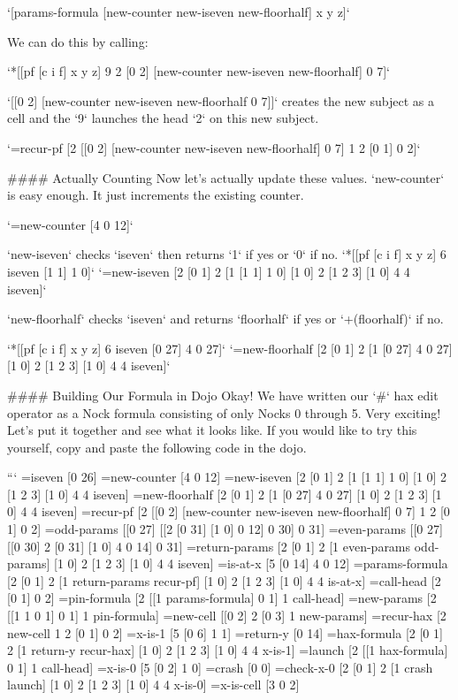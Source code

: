 \documentclass[twoside]{article}
\begin{document}
`[params-formula [new-counter new-iseven new-floorhalf] x y z]`

We can do this by calling:


`*[[pf [c i f] x y z] 9 2 [0 2] [new-counter new-iseven new-floorhalf] 0 7]`  

`[[0 2] [new-counter new-iseven new-floorhalf 0 7]]` creates the new subject as a cell and the `9` launches the head `2` on this new subject.

`=recur-pf [2 [[0 2] [new-counter new-iseven new-floorhalf] 0 7] 1 2 [0 1] 0 2]`  

#### Actually Counting
Now let's actually update these values. `new-counter` is easy enough. It just increments the existing counter.

`=new-counter [4 0 12]`

`new-iseven` checks `iseven` then returns `1` if yes or `0` if no.  
`*[[pf [c i f] x y z] 6 iseven [1 1] 1 0]`  
`=new-iseven [2 [0 1] 2 [1 [1 1] 1 0] [1 0] 2 [1 2 3] [1 0] 4 4 iseven]`  

`new-floorhalf` checks `iseven` and returns `floorhalf` if yes or
`+(floorhalf)` if no.

`*[[pf [c i f] x y z] 6 iseven [0 27] 4 0 27]`  
`=new-floorhalf [2 [0 1] 2 [1 [0 27] 4 0 27] [1 0] 2 [1 2 3] [1 0] 4 4 iseven]`  

#### Building Our Formula in Dojo
Okay! We have written our `#` hax edit operator as a Nock formula consisting of only Nocks 0 through 5. Very exciting! Let's put it together and see what it looks like. If you would like to try this yourself, copy and paste the following code in the dojo.

```
=iseven [0 26]
=new-counter [4 0 12]
=new-iseven [2 [0 1] 2 [1 [1 1] 1 0] [1 0] 2 [1 2 3] [1 0] 4 4 iseven]
=new-floorhalf [2 [0 1] 2 [1 [0 27] 4 0 27] [1 0] 2 [1 2 3] [1 0] 4 4 iseven]
=recur-pf [2 [[0 2] [new-counter new-iseven new-floorhalf] 0 7] 1 2 [0 1] 0 2] 
=odd-params [[0 27] [[2 [0 31] [1 0] 0 12] 0 30] 0 31]
=even-params [[0 27] [[0 30] 2 [0 31] [1 0] 4 0 14] 0 31]
=return-params [2 [0 1] 2 [1 even-params odd-params] [1 0] 2 [1 2 3] [1 0] 4 4 iseven]
=is-at-x [5 [0 14] 4 0 12]
=params-formula [2 [0 1] 2 [1 return-params recur-pf] [1 0] 2 [1 2 3] [1 0] 4 4 is-at-x]
=call-head [2 [0 1] 0 2]
=pin-formula [2 [[1 params-formula] 0 1] 1 call-head]
=new-params [2 [[1 1 0 1] 0 1] 1 pin-formula]
=new-cell [[0 2] 2 [0 3] 1 new-params]
=recur-hax [2 new-cell 1 2 [0 1] 0 2]
=x-is-1 [5 [0 6] 1 1]
=return-y [0 14]
=hax-formula [2 [0 1] 2 [1 return-y recur-hax] [1 0] 2 [1 2 3] [1 0] 4 4 x-is-1]
=launch [2 [[1 hax-formula] 0 1] 1 call-head]
=x-is-0 [5 [0 2] 1 0]
=crash [0 0]
=check-x-0 [2 [0 1] 2 [1 crash launch] [1 0] 2 [1 2 3] [1 0] 4 4 x-is-0]
=x-is-cell [3 0 2]
\end{document}
